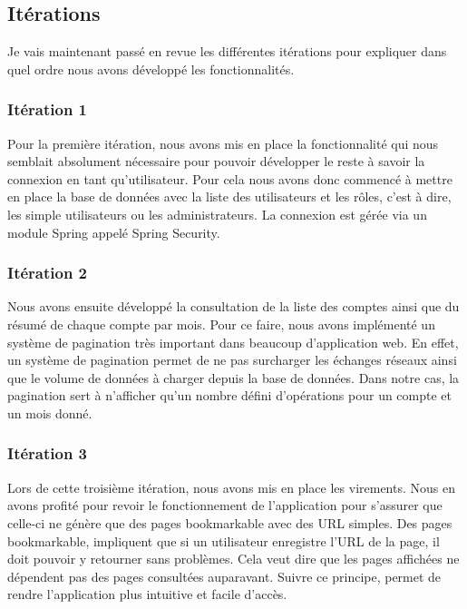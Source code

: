 \subsection{Itérations}

Je vais maintenant passé en revue les différentes itérations pour expliquer dans quel ordre nous avons développé les fonctionnalités.

\subsubsection{Itération 1}

Pour la première itération, nous avons mis en place la fonctionnalité qui nous semblait absolument nécessaire pour pouvoir développer le reste à savoir la connexion en tant qu'utilisateur. Pour cela nous avons donc commencé à mettre en place la base de données avec la liste des utilisateurs et les rôles, c'est à dire, les simple utilisateurs ou les administrateurs. La connexion est gérée via un module Spring appelé Spring Security.

\subsubsection{Itération 2}

Nous avons ensuite développé la consultation de la liste des comptes ainsi que du résumé de chaque compte par mois. Pour ce faire, nous avons implémenté un système de pagination très important dans beaucoup d'application web. En effet, un système de pagination permet de ne pas surcharger les échanges réseaux ainsi que le volume de données à charger depuis la base de données. Dans notre cas, la pagination sert à n'afficher qu'un nombre défini d'opérations pour un compte et un mois donné.

\subsubsection{Itération 3}

Lors de cette troisième itération, nous avons mis en place les virements. Nous en avons profité pour revoir le fonctionnement de l'application pour s'assurer que celle-ci ne génère que des pages \flqq{}bookmarkable\frqq{} avec des URL simples. Des pages bookmarkable, impliquent que si un utilisateur enregistre l'URL de la page, il doit pouvoir y retourner sans problèmes. Cela veut dire que les pages affichées ne dépendent pas des pages consultées auparavant. Suivre ce principe, permet de rendre l'application plus intuitive et facile d'accès.

